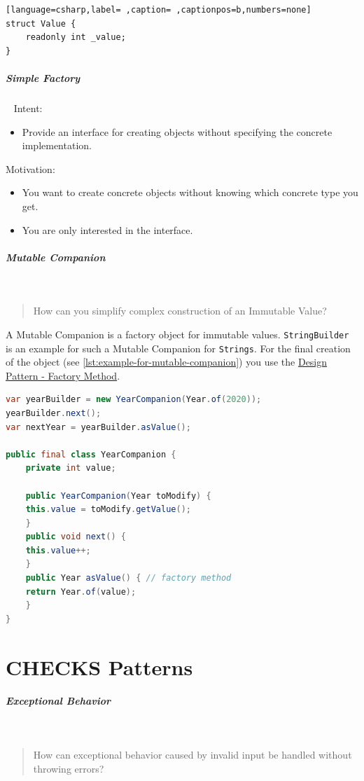 \documentclass[11pt,twoside,landscape]{article}
\begin{document}
\begin{multicols}{3}
\begin{lstlisting}[language=csharp,label= ,caption= ,captionpos=b,numbers=none]
struct Value {
    readonly int _value;
}
\end{lstlisting}
\subparagraph{Simple Factory} \
\label{sec:orgb81d636}
Intent:
\begin{itemize}
\item Provide an interface for creating objects without specifying the concrete implementation.
\end{itemize}

Motivation:
\begin{itemize}
\item You want to create concrete objects without knowing which concrete type you get.
\item You are only interested in the interface.
\end{itemize}
\subparagraph{Mutable Companion} \
\label{sec:org8e6474a}
\begin{quote}
How can you simplify complex construction of an Immutable Value?
\end{quote}


A Mutable Companion is a factory object for immutable values.
\texttt{StringBuilder} is an example for such a Mutable Companion for \texttt{Strings}.
For the final creation of the object (see \autoref{lst:example-for-mutable-companion}) you use the \href{../../../roam/20220413195351-design_pattern_factory_method.org}{Design Pattern - Factory Method}.

\begin{lstlisting}[language=java,label=lst:example-for-mutable-companion,caption={Example for Mutable Companion},captionpos=b,numbers=none]
var yearBuilder = new YearCompanion(Year.of(2020));
yearBuilder.next();
var nextYear = yearBuilder.asValue();

public final class YearCompanion {
    private int value;

    public YearCompanion(Year toModify) {
	this.value = toModify.getValue();
    }
    public void next() {
	this.value++;
    }
    public Year asValue() { // factory method
	return Year.of(value);
    }
}
\end{lstlisting}
\section{CHECKS Patterns}
\label{sec:org475d1c3}
\subparagraph{Exceptional Behavior} \
\label{sec:org19332dd}
\begin{quote}
How can exceptional behavior caused by invalid input be handled without throwing errors?
\end{quote}


\end{multicols}
\end{document}
